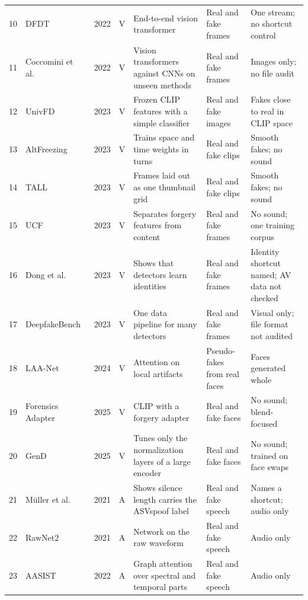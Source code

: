 {\begin{longtable}{@{}r >{\raggedright\arraybackslash}p{2.5cm} c c >{\raggedright\arraybackslash}p{3.9cm} >{\raggedright\arraybackslash}p{2.5cm} >{\raggedright\arraybackslash}p{3.5cm}@{}}
        10 & DFDT~\cite{khormali2022} & 2022 & V & End-to-end vision transformer & Real and fake frames & One stream; no shortcut control \\
        11 & Coccomini et al.~\cite{coccomini2022} & 2022 & V & Vision transformers against CNNs on unseen methods & Real and fake frames & Images only; no file audit \\
        12 & UnivFD~\cite{univfd} & 2023 & V & Frozen CLIP features with a simple classifier & Real and fake images & Fakes close to real in CLIP space \\
        13 & AltFreezing~\cite{altfreezing} & 2023 & V & Trains space and time weights in turns & Real and fake clips & Smooth fakes; no sound \\
        14 & TALL~\cite{tall} & 2023 & V & Frames laid out as one thumbnail grid & Real and fake clips & Smooth fakes; no sound \\
        15 & UCF~\cite{ucf} & 2023 & V & Separates forgery features from content & Real and fake frames & No sound; one training corpus \\
        16 & Dong et al.~\cite{dong2023} & 2023 & V & Shows that detectors learn identities & Real and fake frames & Identity shortcut named; AV data not checked \\
        17 & DeepfakeBench~\cite{deepfakebench} & 2023 & V & One data pipeline for many detectors & Real and fake frames & Visual only; file format not audited \\
        18 & LAA-Net~\cite{laanet} & 2024 & V & Attention on local artifacts & Pseudo-fakes from real faces & Faces generated whole \\
        19 & Forensics Adapter~\cite{forensicsadapter} & 2025 & V & CLIP with a forgery adapter & Real and fake faces & No sound; blend-focused \\
        20 & GenD~\cite{gend} & 2025 & V & Tunes only the normalization layers of a large encoder & Real and fake faces & No sound; trained on face swaps \\
        21 & M\"uller et al.~\cite{mueller2021} & 2021 & A & Shows silence length carries the ASVspoof label & Real and fake speech & Names a shortcut; audio only \\
        22 & RawNet2~\cite{rawnet2} & 2021 & A & Network on the raw waveform & Real and fake speech & Audio only \\
        23 & AASIST~\cite{aasist} & 2022 & A & Graph attention over spectral and temporal parts & Real and fake speech & Audio only \\

\end{longtable}}
